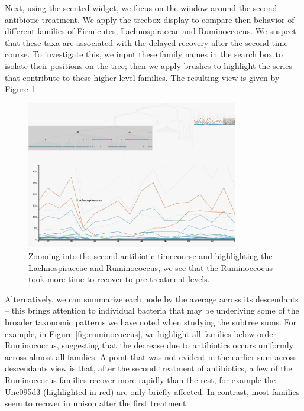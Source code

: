 \documentclass[12pt]{article}
\begin{document}
Next, using the scented widget, we focus on the window around the second
antibiotic treatment. We apply the treebox display to compare then
behavior of different families of Firmicutes, Lachnospiraceae and
Ruminoccocus. We suspect that these taxa are associated with the delayed
recovery after the second time course. To investigate this, we input
these family names in the search box to isolate their positions on the
tree; then we apply brushes to highlight the series that contribute to
these higher-level families. The resulting view is given by Figure
\ref{fig:antibioticfirmicutes}

\begin{figure}

{\centering \includegraphics[width=350px]{figure/antibiotic_firmicutes}

}

\caption{Zooming into the second antibiotic timecourse and highlighting the Lachnospiraceae and Ruminococcus, we see that the Ruminoccocus took more time to recover to pre-treatment levels.}\label{fig:antibioticfirmicutes}
\end{figure}

Alternatively, we can summarize each node by the average across its
descendants -- this brings attention to individual bacteria that may be
underlying some of the broader taxonomic patterns we have noted when
studying the subtree sums. For example, in Figure
\ref{fig:ruminococcus}, we highlight all families below order
Ruminococcus, suggesting that the decrease due to antibiotics occurs
uniformly across almost all families. A point that was not evident in
the earlier sum-across-descendants view is that, after the second
treatment of antibiotics, a few of the Ruminoccocus families recover
more rapidly than the rest, for example the Unc095d3 (highlighted in
red) are only briefly affected. In contrast, most families seem to
recover in unison after the first treatment.
\end{document}
